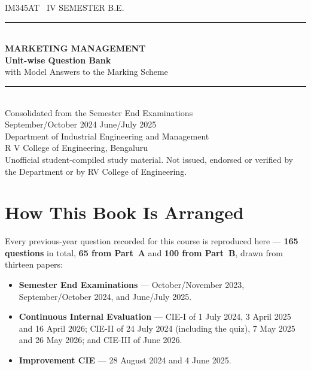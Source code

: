 \documentclass[11pt,a4paper,oneside]{book}
\newenvironment{abul}
  {\begin{itemize}[leftmargin=1.5em,itemsep=1.5pt,topsep=3pt,parsep=0pt,
                   label=\textcolor{ocre}{\scriptsize$\blacksquare$}]}
  {\end{itemize}}
\begin{document}
\frontmatter
\pagestyle{empty}

\begin{center}
\vspace*{34mm}
{\sffamily\color{ocre}\large IM345AT \textbullet\ IV SEMESTER B.E.}\\[3mm]
{\color{rule}\rule{0.55\textwidth}{1pt}}\\[9mm]
{\sffamily\bfseries\color{slate}\Huge MARKETING MANAGEMENT}\\[7mm]
{\sffamily\bfseries\color{slate}\LARGE Unit-wise Question Bank}\\[3mm]
{\sffamily\color{slatelight}\Large with Model Answers to the Marking Scheme}\\[12mm]
{\color{rule}\rule{0.55\textwidth}{1pt}}\\[9mm]
{\sffamily\color{slate}\large Consolidated from the Semester End Examinations}\\[2mm]
{\sffamily\color{slatelight}\large September/October 2024 \quad\textbullet\quad
 June/July 2025}\\[16mm]
{\sffamily\color{slatelight} Department of Industrial Engineering and Management}\\[1mm]
{\sffamily\color{slatelight} R V College of Engineering, Bengaluru}\\
\vfill
{\footnotesize\sffamily\color{slatelight}
 Unofficial student-compiled study material. Not issued, endorsed or verified
 by the Department or by RV College of Engineering.}
\vspace*{12mm}
\end{center}
\clearpage

\chapter*{How This Book Is Arranged}
\thispagestyle{plain}

Every previous-year question recorded for this course is reproduced here ---
\textbf{165 questions} in total, \textbf{65 from Part~A} and \textbf{100 from
Part~B}, drawn from thirteen papers:

\begin{abul}
\item \textbf{Semester End Examinations} --- October/November 2023,
      September/October 2024, and June/July 2025.
\item \textbf{Continuous Internal Evaluation} --- CIE-I of 1 July 2024, 3 April
      2025 and 16 April 2026; CIE-II of 24 July 2024 (including the quiz),
      7 May 2025 and 26 May 2026; and CIE-III of June 2026.
\item \textbf{Improvement CIE} --- 28 August 2024 and 4 June 2025.
\end{abul}
\end{document}
